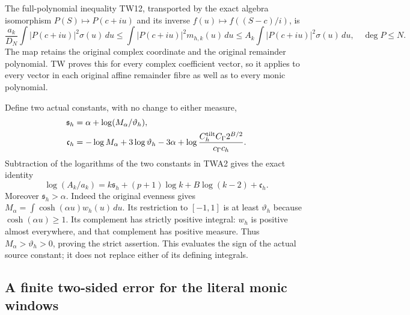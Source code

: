 \documentclass[11pt,a4paper]{article}
\begin{document}
The full-polynomial inequality TW12, transported by the exact algebra
isomorphism $P(S)\mapsto P(c+iu)$ and its inverse
$f(u)\mapsto f((S-c)/i)$, is
\[
\frac{a_k}{D_N}\int|P(c+iu)|^2\sigma(u)\,du
\le\int|P(c+iu)|^2m_{h,k}(u)\,du
\le A_k\int|P(c+iu)|^2\sigma(u)\,du,
\quad\deg P\le N.\tag{TWA3}
\]
The map retains the original complex coordinate and the original
remainder polynomial. TW proves this for every complex coefficient
vector, so it applies to every vector in each original affine
remainder fibre as well as to every monic polynomial.

Define two actual constants, with no change to either measure,
\[
\begin{aligned}
\mathfrak s_h&=\alpha+\log(M_\alpha/\vartheta_h),\\
\mathfrak c_h&=-\log M_\alpha+3\log\vartheta_h-3\alpha
 +\log\frac{C_h^{\rm tilt}C_\Gamma2^{B/2}}{c_\Gamma c_h}.
\end{aligned}
\]
Subtraction of the logarithms of the two constants in TWA2 gives
the exact identity
\[
\log(A_k/a_k)=k\mathfrak s_h+(p+1)\log k
                      +B\log(k-2)+\mathfrak c_h.\tag{TWA4}
\]
Moreover $\mathfrak s_h>\alpha$. Indeed the original evenness gives
$M_\alpha=\int\cosh(\alpha u)w_h(u)\,du$.
Its restriction to $[-1,1]$ is at least $\vartheta_h$ because
$\cosh(\alpha u)\ge1$. Its complement has strictly positive integral:
$w_h$ is positive almost everywhere, and that complement has positive
measure. Thus $M_\alpha>\vartheta_h>0$, proving the strict assertion.
This evaluates the sign of the actual source constant; it does not
replace either of its defining integrals.

\subsection{A finite two-sided error for the literal monic windows}
\end{document}
